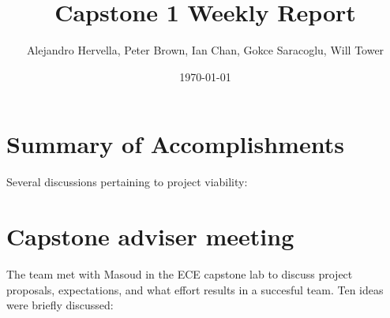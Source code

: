 \documentclass[11pt]{article}
\author{Alejandro Hervella, Peter Brown, Ian Chan, Gokce Saracoglu, Will Tower}
\date{\today}
\title{Capstone 1 Weekly Report}
\begin{document}
\maketitle
\tableofcontents


\section{Summary of Accomplishments}
\label{sec:org706a6f1}

Several discussions pertaining to project viability:

\section{Capstone adviser meeting}
\label{sec:org2b3ece5}
The team met with Masoud in the ECE capstone lab to discuss project proposals, expectations, and what effort results in a succesful team. Ten ideas were briefly discussed:
\end{document}
